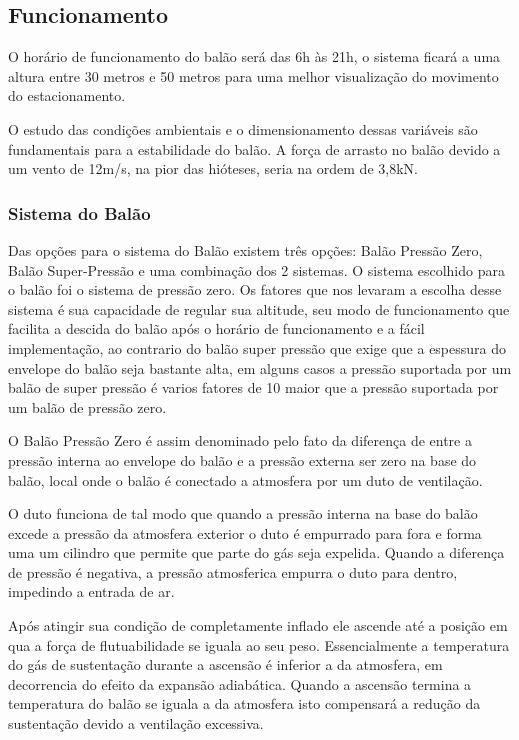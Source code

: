 \subsection{Funcionamento}
    O horário de funcionamento do balão será das 6h às 21h, o sistema ficará a uma altura entre 30 metros e 50 metros para uma melhor visualização do movimento do estacionamento.

    O estudo das condições ambientais e o dimensionamento dessas variáveis são fundamentais para a estabilidade do balão. A força de arrasto no balão devido a um vento de 12m/s, na pior das hióteses, seria na ordem de 3,8kN.

  \subsubsection{Sistema do Balão}
    Das opções para o sistema do Balão existem três opções: Balão Pressão Zero, Balão Super-Pressão e uma combinação dos 2 sistemas.
    O sistema escolhido para o balão foi o sistema de pressão zero. Os fatores que nos levaram a escolha desse sistema é sua capacidade de regular sua altitude, seu modo de funcionamento que facilita a descida do balão após o horário de funcionamento e a fácil implementação, ao contrario do balão super pressão que exige que a espessura do envelope do balão seja bastante alta, em alguns casos a pressão suportada por um balão de super pressão é varios fatores de 10 maior que a pressão suportada por um balão de pressão zero.

    O Balão Pressão Zero é assim denominado pelo fato da diferença de entre a pressão interna ao envelope do balão e a pressão externa ser zero na base do balão, local onde o balão é conectado a atmosfera por um duto de ventilação.
    
    O duto funciona de tal modo que quando a pressão interna na base do balão excede a pressão da atmosfera exterior o duto é empurrado para fora e forma uma um cilindro que permite que parte do gás seja expelida. Quando a diferença de pressão é negativa, a pressão atmosferica empurra o duto para dentro, impedindo a entrada de ar.
    
    Após atingir sua condição de completamente inflado ele ascende até a posição em qua a força de flutuabilidade se iguala ao seu peso. Essencialmente a temperatura do gás de sustentação durante a ascensão é inferior a da atmosfera, em decorrencia do efeito da expansão adiabática. Quando a ascensão termina a temperatura do balão se iguala a da atmosfera isto compensará a redução da sustentação devido a ventilação excessiva.
    
